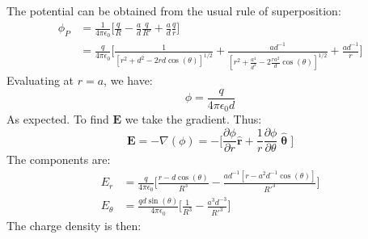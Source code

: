                 \begin{solution}
                    The potential can be obtained from the usual rule
                    of superposition:
                    \begin{align}
                        \phi_{P}&=\frac{1}{4\pi\epsilon_{0}}\Big[
                        \frac{q}{R}-\frac{a}{d}\frac{q}{R'}+
                        \frac{a}{d}\frac{q}{r}\Big]\\
                        &=\frac{q}{4\pi\epsilon_{0}}\Big[
                            \frac{1}{[r^{2}+d^{2}-2rd\cos(\theta)]^{1/2}}
                            +\frac{ad^{\minus{1}}}
                                {[r^{2}+\frac{a^{4}}{d^{2}}
                                 -2\frac{ra^{2}}{d}\cos(\theta)]^{1/2}}
                            +\frac{ad^{\minus{1}}}{r}\Big]
                    \end{align}
                    Evaluating at $r=a$, we have:
                    \begin{equation}
                        \phi=\frac{q}{4\pi\epsilon_{0}d}
                    \end{equation}
                    As expected. To find $\mathbf{E}$ we take the
                    gradient. Thus:
                    \begin{equation}
                        \mathbf{E}=\minus\nabla(\phi)
                        =\minus\Big[
                            \frac{\partial\phi}{\partial{r}}
                            \hat{\mathbf{r}}+\frac{1}{r}
                            \frac{\partial\phi}{\partial\theta}
                            \hat{\mathbf{\uptheta}}\Big]
                    \end{equation}
                    The components are:
                    \begin{align}
                        E_{r}&=\frac{q}{4\pi\epsilon_{0}}\Big[
                            \frac{r-d\cos(\theta)}{R^{3}}-
                            \frac{ad^{\minus{1}}
                                  [r-a^{2}d^{\minus{1}}\cos(\theta)]}
                                 {R'^{3}}\Big]\\
                        E_{\theta}&=
                            \frac{qd\sin(\theta)}{4\pi\epsilon_{0}}
                            \Big[\frac{1}{R^{3}}-
                                \frac{a^{3}d^{\minus{3}}}{R'^{3}}\Big]
                    \end{align}
                    The charge density is then:
                    \begin{equation}

\end{equation}
\end{solution}
